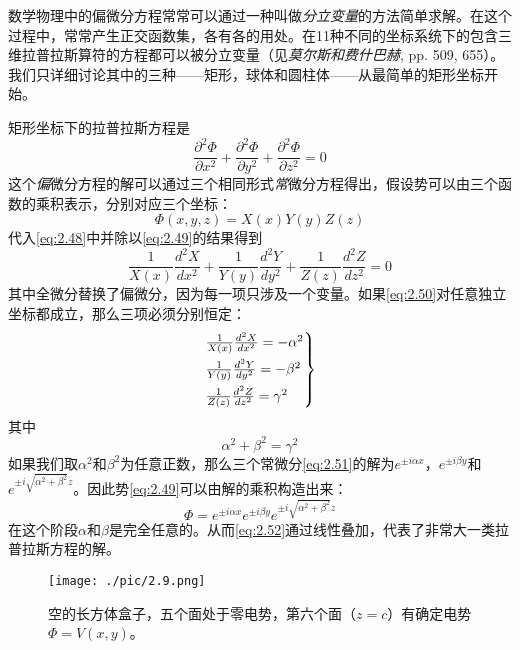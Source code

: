 \documentclass[12pt]{book}
\numberwithin{equation}{chapter}
\numberwithin{figure}{chapter}
\numberwithin{footnote}{page}
\begin{document}
数学物理中的偏微分方程常常可以通过一种叫做\textit{分立变量}的方法简单求解。在这个过程中，常常产生正交函数集，各有各的用处。在11种不同的坐标系统下的包含三维拉普拉斯算符的方程都可以被分立变量（见\textit{莫尔斯和费什巴赫}, pp. 509, 655）。我们只详细讨论其中的三种——矩形，球体和圆柱体——从最简单的矩形坐标开始。

矩形坐标下的拉普拉斯方程是
\begin{equation}\label{eq:2.48}
    \frac{\partial^2 \Phi}{\partial x^2}+\frac{\partial^2 \Phi}{\partial y^2}+\frac{\partial^2 \Phi}{\partial z^2}=0
\end{equation}
这个\textit{偏}微分方程的解可以通过三个相同形式\textit{常}微分方程得出，假设势可以由三个函数的乘积表示，分别对应三个坐标：
\begin{equation}\label{eq:2.49}
    \Phi(x,y,z)=X(x)Y(y)Z(z)
\end{equation}
代入\autoref{eq:2.48}中并除以\autoref{eq:2.49}的结果得到
\begin{equation}\label{eq:2.50}
    \frac{1}{X(x)}\frac{d^2 X}{dx^2}+\frac{1}{Y(y)}\frac{d^2 Y}{dy^2}+\frac{1}{Z(z)}\frac{d^2 Z}{dz^2}=0
\end{equation}
其中全微分替换了偏微分，因为每一项只涉及一个变量。如果\autoref{eq:2.50}对任意独立坐标都成立，那么三项必须分别恒定：
\begin{equation}\label{eq:2.51}
    \begin{rcases*}
        \frac{1}{X(x)}\frac{d^2 X}{dx^2}=-\alpha^2\\
        \frac{1}{Y(y)}\frac{d^2 Y}{dy^2}=-\beta^2\\
        \frac{1}{Z(z)}\frac{d^2 Z}{dz^2}=\gamma^2\\
    \end{rcases*}
\end{equation}
其中
$$\alpha^2+\beta^2=\gamma^2$$
如果我们取$\alpha^2$和$\beta^2$为任意正数，那么三个常微分\autoref{eq:2.51}的解为$e^{\pm i\alpha x}$，$e^{\pm i\beta y}$和$e^{\pm i\sqrt{\alpha^2+\beta^2} z}$。因此势\autoref{eq:2.49}可以由解的乘积构造出来：
\begin{equation}\label{eq:2.52}
    \Phi=e^{\pm i\alpha x} e^{\pm i\beta y} e^{\pm i\sqrt{\alpha^2+\beta^2} z}
\end{equation}
在这个阶段$\alpha$和$\beta$是完全任意的。从而\autoref{eq:2.52}通过线性叠加，代表了非常大一类拉普拉斯方程的解。

\begin{figure}[!ht]
    \centering
    \texttt{[image: ./pic/2.9.png]}
    \captionsetup{justification=raggedright, singlelinecheck=false}
    \caption{空的长方体盒子，五个面处于零电势，第六个面（$z=c$）有确定电势$\Phi=V(x,y)$。}
    \label{fig:2.9}
\end{figure}
\end{document}
